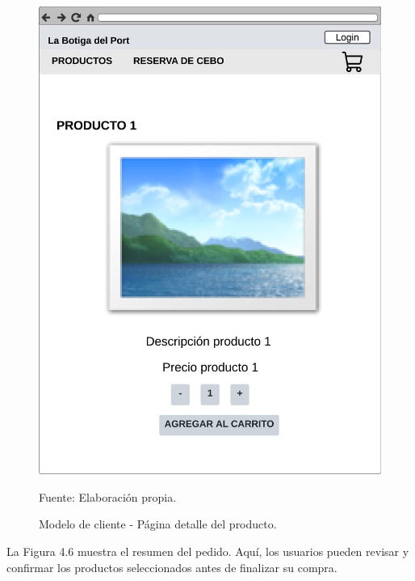 \begin{figure}[H]
\begin{center}
\includegraphics[scale=0.5]{./Images/detalle_producto.png}
\caption{Modelo de cliente - Página detalle del producto.} Fuente: Elaboración propia.

\label{fig:fig5}

\end{center}
\end{figure}

La Figura 4.6 muestra el resumen del pedido. Aquí, los usuarios pueden revisar y confirmar los productos seleccionados antes de finalizar su compra.


